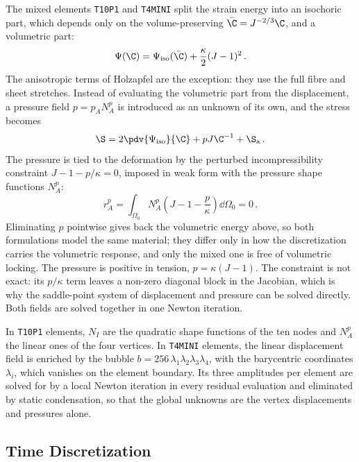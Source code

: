 The mixed elements \verb+T10P1+ and \verb+T4MINI+ split the strain energy into an isochoric part, which depends only on the volume-preserving $\bar{\C} = J^{-2/3} \C$, and a volumetric part:
\begin{equation}
    \Psi(\C) = \Psi_\mathrm{iso}(\bar{\C}) + \frac{\kappa}{2} (J-1)^2 \,.
\end{equation}
The anisotropic terms of Holzapfel are the exception: they use the full fibre and sheet stretches.
Instead of evaluating the volumetric part from the displacement, a pressure field $p = p_A N^p_A$ is introduced as an unknown of its own, and the stress becomes
\begin{equation}
    \S = 2 \pdv{\Psi_\mathrm{iso}}{\C} + p J \C^{-1} + \S_\mathrm{a} \,.
\end{equation}
The pressure is tied to the deformation by the perturbed incompressibility constraint $J - 1 - p/\kappa = 0$, imposed in weak form with the pressure shape functions $N^p_A$:
\begin{equation}
    r^p_A = \int_{\Omega_0} N^p_A \left( J - 1 - \frac{p}{\kappa} \right) \dd{\Omega_0} = 0 \,.
\end{equation}
Eliminating $p$ pointwise gives back the volumetric energy above, so both formulations model the same material; they differ only in how the discretization carries the volumetric response, and only the mixed one is free of volumetric locking.
The pressure is positive in tension, $p = \kappa (J-1)$.
The constraint is not exact: its $p/\kappa$ term leaves a non-zero diagonal block in the Jacobian, which is why the saddle-point system of displacement and pressure can be solved directly.
Both fields are solved together in one Newton iteration.

In \verb+T10P1+ elements, $N_I$ are the quadratic shape functions of the ten nodes and $N^p_A$ the linear ones of the four vertices.
In \verb+T4MINI+ elements, the linear displacement field is enriched by the bubble $b = 256\, \lambda_1 \lambda_2 \lambda_3 \lambda_4$, with the barycentric coordinates $\lambda_i$, which vanishes on the element boundary.
Its three amplitudes per element are solved for by a local Newton iteration in every residual evaluation and eliminated by static condensation, so that the global unknowns are the vertex displacements and pressures alone.

\subsection{Time Discretization}

